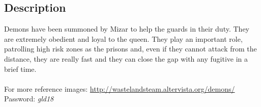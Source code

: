 \subsection{Description}
Demons have been summoned by Mizar to help the guards in their duty. They are extremely obedient and loyal to the queen. They play an important role, patrolling high risk zones as the prisons and, even if they cannot attack from the distance, they are really fast and they can close the gap with any fugitive in a brief time.\\\\
For more reference images: \href{http://wastelandsteam.altervista.org/demons/}{http://wastelandsteam.altervista.org/demons/}\\
Password: \textit{gld18}


